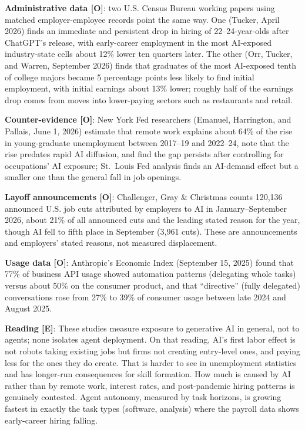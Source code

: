 \documentclass[11pt,letterpaper]{article}
\begin{document}
\textbf{Administrative data [O]}: two U.S. Census Bureau working papers using matched employer-employee records point the same way. One (Tucker, April 2026) finds an immediate and persistent drop in hiring of 22--24-year-olds after ChatGPT's release, with early-career employment in the most AI-exposed industry-state cells about 12\% lower ten quarters later. The other (Orr, Tucker, and Warren, September 2026) finds that graduates of the most AI-exposed tenth of college majors became 5 percentage points less likely to find initial employment, with initial earnings about 13\% lower; roughly half of the earnings drop comes from moves into lower-paying sectors such as restaurants and retail.

\textbf{Counter-evidence [O]}: New York Fed researchers (Emanuel, Harrington, and Pallais, June 1, 2026) estimate that remote work explains about 64\% of the rise in young-graduate unemployment between 2017--19 and 2022--24, note that the rise predates rapid AI diffusion, and find the gap persists after controlling for occupations' AI exposure; St.\ Louis Fed analysis finds an AI-demand effect but a smaller one than the general fall in job openings.

\textbf{Layoff announcements [O]}: Challenger, Gray \& Christmas counts 120,136 announced U.S. job cuts attributed by employers to AI in January--September 2026, about 21\% of all announced cuts and the leading stated reason for the year, though AI fell to fifth place in September (3,961 cuts). These are announcements and employers' stated reasons, not measured displacement.

\textbf{Usage data [O]}: Anthropic's Economic Index (September 15, 2025) found that 77\% of business API usage showed automation patterns (delegating whole tasks) versus about 50\% on the consumer product, and that ``directive'' (fully delegated) conversations rose from 27\% to 39\% of consumer usage between late 2024 and August 2025.

\textbf{Reading [E]}: These studies measure exposure to generative AI in general, not to agents; none isolates agent deployment. On that reading, AI's first labor effect is not robots taking existing jobs but firms not creating entry-level ones, and paying less for the ones they do create. That is harder to see in unemployment statistics and has longer-run consequences for skill formation. How much is caused by AI rather than by remote work, interest rates, and post-pandemic hiring patterns is genuinely contested. Agent autonomy, measured by task horizons, is growing fastest in exactly the task types (software, analysis) where the payroll data shows early-career hiring falling.
\end{document}
